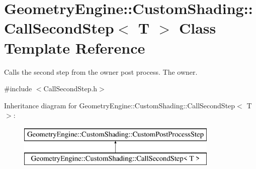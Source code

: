 \hypertarget{class_geometry_engine_1_1_custom_shading_1_1_call_second_step}{}\section{Geometry\+Engine\+::Custom\+Shading\+::Call\+Second\+Step$<$ T $>$ Class Template Reference}
\label{class_geometry_engine_1_1_custom_shading_1_1_call_second_step}


Calls the second step from the owner post process. The owner.  




{\ttfamily \#include $<$Call\+Second\+Step.\+h$>$}

Inheritance diagram for Geometry\+Engine\+::Custom\+Shading\+::Call\+Second\+Step$<$ T $>$\+:\begin{figure}[H]
\begin{center}
\leavevmode
\includegraphics[height=2.000000cm]{class_geometry_engine_1_1_custom_shading_1_1_call_second_step}
\end{center}
\end{figure}
